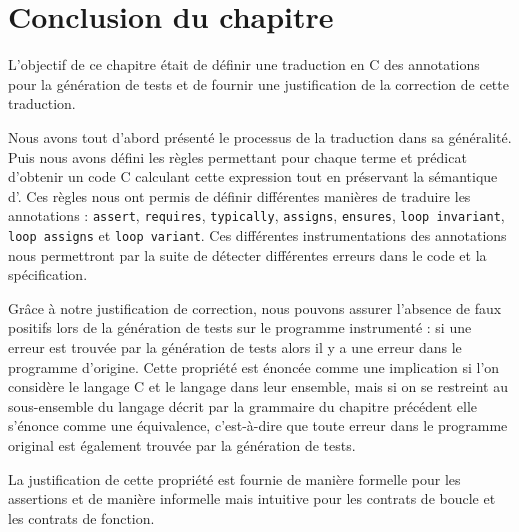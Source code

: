 \section*{Conclusion du chapitre}

L'objectif de ce chapitre était de définir une traduction en C des annotations
\eacsl pour la génération de tests et de fournir une justification de la
correction de cette traduction.

Nous avons tout d'abord présenté le processus de la traduction dans sa
généralité.
Puis nous avons défini les règles permettant pour chaque terme et prédicat
\eacsl d'obtenir un code C calculant cette expression tout en préservant la
sémantique d'\eacsl.
Ces règles nous ont permis de définir différentes manières de traduire les
annotations \eacsl : \lstinline'assert', \lstinline'requires',
\lstinline'typically', \lstinline'assigns', \lstinline'ensures',
\lstinline'loop invariant', \lstinline'loop assigns' et
\lstinline'loop variant'.
Ces différentes instrumentations des annotations nous permettront par la suite
de détecter différentes erreurs dans le code et la spécification.

Grâce à notre justification de correction, nous pouvons assurer l'absence de
faux positifs lors de la génération de tests sur le programme instrumenté : si
une erreur est trouvée par la génération de tests alors il y a une erreur dans
le programme d'origine.
Cette propriété est énoncée comme une implication si l'on considère le langage
C et le langage \eacsl dans leur ensemble, mais si on se restreint au
sous-ensemble du langage décrit par la grammaire du chapitre précédent elle
s'énonce comme une équivalence, c'est-à-dire que toute erreur dans le programme
original est également trouvée par la génération de tests.

La justification de cette propriété est fournie de manière formelle pour les
assertions et de manière informelle mais intuitive pour les contrats de boucle
et les contrats de fonction.
